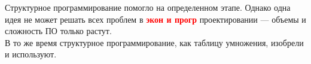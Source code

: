 \documentclass[main]{subfiles}
\begin{document}
    Структурное программирование помогло на определенном этапе. Однако одна идея не может решать всех проблем в \textbf{\textcolor{red}{экон и прогр}} проектировании --- объемы и сложность ПО только растут.\\

    В то же время структурное программирование, как таблицу умножения, изобрели и используют.
\end{document}
